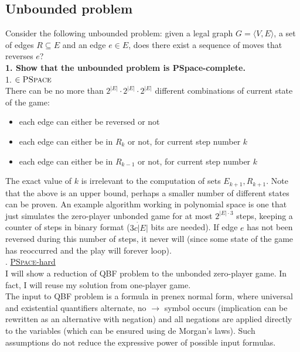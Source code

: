 \subsection*{Unbounded problem}
Consider the following unbounded problem: given a legal graph $G = \langle V, E \rangle$,
a set of edges $R \subseteq E$ and an edge $e \in E$, does there exist a sequence of moves
that reverses $e$?\\
\textbf{1. Show that the unbounded problem is PSpace-complete.}\\
1. \underline{$\in \textsc{PSpace}$}\\
There can be no more than $2^{|E|} \cdot 2^{|E|} \cdot 2^{|E|}$ different combinations of current state of the game:
\begin{itemize}
      \item each edge can either be reversed or not
      \item each edge can either be in $R_k$ or not, for current step number $k$ 
      \item each edge can either be in $R_{k-1}$ or not, for current step number $k$ 
\end{itemize}
The exact value of $k$ is irrelevant to the computation of sets $E_{k+1}, R_{k+1}$. Note that
the above is an upper bound, perhaps a smaller number of different states can be proven.
An example algorithm working in polynomial space is one that just simulates the zero-player unbonded game for
at most $2^{|E| \cdot 3}$ steps, keeping a counter of steps in binary format ($3c \dot |E|$ bits are needed).
If edge $e$ has not been reversed during this number of steps, it never will (since some state of the game
has reoccurred and the play will forever loop).\\

. \underline{\textsc{PSpace}-hard}\\
I will show a reduction of QBF problem to the unbonded zero-player game. In fact, I will reuse my
solution from one-player game.\\
The input to QBF problem is a formula in prenex normal form, where universal and existential quantifiers
alternate, no $\rightarrow$ symbol occurs (implication can be rewritten as an alternative with negation)
and all negations are applied directly to the variables (which can be ensured using de Morgan's laws).
Such assumptions do not reduce the expressive power of possible input formulas.

